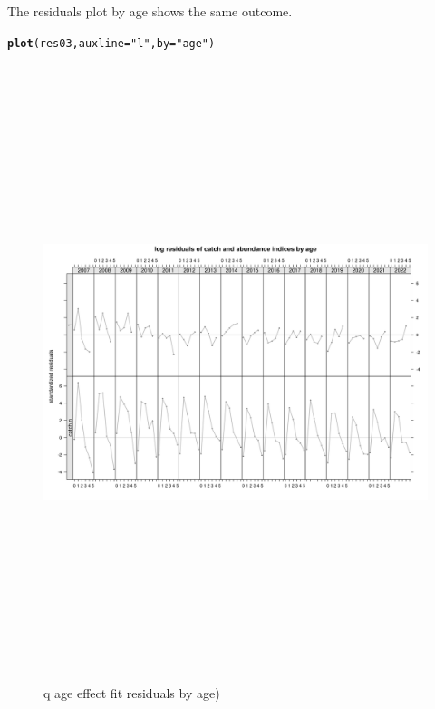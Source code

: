 \documentclass[a4paper,english,11pt]{article}\usepackage[]{graphicx}\usepackage[]{xcolor}
\makeatletter
\newcommand{\hlsng}[1]{\textcolor[rgb]{0.192,0.494,0.8}{#1}}%
\newcommand{\hldef}[1]{\textcolor[rgb]{0.345,0.345,0.345}{#1}}%
\newcommand{\hlkwc}[1]{\textcolor[rgb]{0.333,0.667,0.333}{#1}}%
\newcommand{\hlkwd}[1]{\textcolor[rgb]{0.737,0.353,0.396}{\textbf{#1}}}%
\newenvironment{kframe}{%
 \def\at@end@of@kframe{}%
 \ifinner\ifhmode%
  \def\at@end@of@kframe{\end{minipage}}%
  \begin{minipage}{\columnwidth}%
 \fi\fi%
 \def\FrameCommand##1{\hskip\@totalleftmargin \hskip-\fboxsep
 \colorbox{shadecolor}{##1}\hskip-\fboxsep
     \hskip-\linewidth \hskip-\@totalleftmargin \hskip\columnwidth}%
 \MakeFramed {\advance\hsize-\width
   \@totalleftmargin\z@ \linewidth\hsize
   \@setminipage}}%
 {\par\unskip\endMakeFramed%
 \at@end@of@kframe}
\newenvironment{knitrout}{}{} %
\makeatother
\begin{document}
The residuals plot by age shows the same outcome.  

\begin{knitrout}
\color{fgcolor}\begin{kframe}
\begin{alltt}
\hlkwd{plot}\hldef{(res03,} \hlkwc{auxline} \hldef{=} \hlsng{"l"}\hldef{,} \hlkwc{by} \hldef{=} \hlsng{"age"}\hldef{)}
\end{alltt}
\end{kframe}\begin{figure}[H]

{\centering \includegraphics[width=25cm,height=18cm,angle=90]{figure/qageresbyage-1} 

}

\caption[q age effect fit residuals by age)]{q age effect fit residuals by age)}\label{fig:qageresbyage}
\end{figure}

\end{knitrout}
\end{document}
